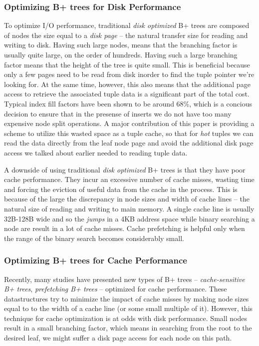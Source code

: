 \documentclass{article}
\begin{document}
\subsubsection{Optimizing B+ trees for Disk Performance}

To optimize I/O performance, traditional \textit{disk optimized} B+ trees are composed of nodes the size equal to a \textit{disk page} -- the natural transfer size for reading and writing to disk. Having such large nodes, means that the branching factor is usually quite large, on the order of hundreds. Having such a large branching factor means that the height of the tree is quite small. This is beneficial because only a few pages need to be read from disk inorder to find the tuple pointer we're looking for. At the same time, however, this also means that the additional page access to retrieve the associated tuple data is a significant part of the total cost. Typical index fill factors have been shown to be around 68\%, which is a concious decision to ensure that in the presense of inserts we do not have too many expensive node split operations. A major contribution of this paper is providing a scheme to utilize this wasted space as a tuple cache, so that for \textit{hot} tuples we can read the data directly from the leaf node page and avoid the additional disk page access we talked about earlier needed to reading tuple data.

A downside of using traditional \textit{disk optimized} B+ trees is that they have poor cache performance. They incur an excessive number of cache misses, wasting time and forcing the eviction of useful data from the cache in the process. This is because of the large the discrepancy in node sizes and width of cache lines -- the natural size of reading and writing to main memory. A single cache line is usually 32B-128B wide and so the \textit{jumps} in a 4KB address space while binary searching a node are result in a lot of cache misses. Cache prefetching is helpful only when the range of the binary search becomes considerably small.

\subsubsection{Optimizing B+ trees for Cache Performance}

Recently, many studies have presented new types of B+ trees -- \textit{cache-sensitive B+ trees}, \textit{prefetching B+ trees} -- optimized for cache performance. These datastructures try to minimize the impact of cache misses by making node sizes equal to to the width of a cache line (or some small multiple of it). However, this technique for cache optimization is at odds with disk performance. Small nodes result in a small branching factor, which means in searching from the root to the desired leaf, we might suffer a disk page access for each node on this path.
\end{document}
